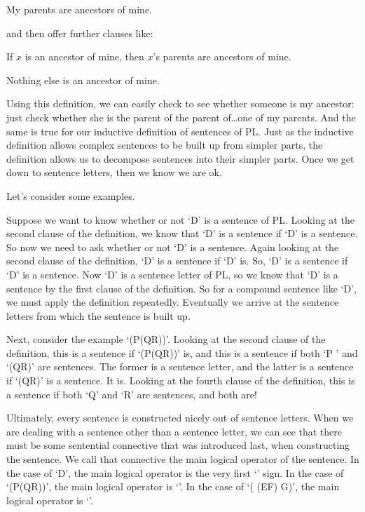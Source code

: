 	\begin{ebullet}
		\item My parents are ancestors of mine.
	\end{ebullet}
and then offer further clauses like:
	\begin{ebullet}
		\item If $x$ is an ancestor of mine, then $x$'s parents are ancestors of mine.
		\item Nothing else is an ancestor of mine.
	\end{ebullet}
Using this definition, we can easily check to see whether someone is my ancestor: just check whether she is the parent of the parent of\ldots one of my parents. And the same is true for our inductive definition of sentences of PL. Just as the inductive definition allows complex sentences to be built up from simpler parts, the definition allows us to decompose sentences into their simpler parts. Once we get down to sentence letters, then we know we are ok.

Let’s consider some examples.

Suppose we want to know whether or not ‘\enot\enot\enot D’ is a sentence of PL. Looking at the second clause of the definition, we know that ‘\enot\enot\enot D’ is a sentence if ‘\enot\enot D’ is a sentence. So now we need to ask whether or not ‘\enot\enot D’ is a sentence. Again looking at the second clause of the definition, ‘\enot\enot D’ is a sentence if ‘\enot D’  is. So, ‘\enot D’ is a sentence if ‘D’ is a sentence. Now ‘D’ is a sentence letter of PL, so we know that ‘D’ is a sentence by the first clause of the definition. So for a compound sentence like ‘\enot\enot\enot D’, we must apply the definition repeatedly. Eventually we arrive at the sentence letters from which the sentence is built up.

Next, consider the example ‘\enot(P\eand \enot(\enot Q\eor  R))’. Looking at the second clause of the definition, this is a sentence if ‘(P\eand \enot(\enot Q\eor R))’ is, and this is a sentence if both ‘P ’ and ‘\enot(\enot Q\eor  R)’ are sentences. The former is a sentence letter, and the latter is a sentence if ‘(\enot Q\eor  R)’ is a sentence. It is. Looking at the fourth clause of the definition, this is a sentence if both ‘\enot Q’ and ‘R’ are sentences, and both are!

Ultimately, every sentence is constructed nicely out of sentence letters. When we are dealing with a sentence other than a sentence letter, we can see that there must be some sentential connective that was introduced last, when constructing the sentence. We call that connective the \gls{main logical operator} of the sentence. In the case of ‘\enot\enot\enot D’, the main logical operator is the very first ‘\enot’ sign. In the case of ‘(P\eand \enot(\enot Q\eor R))’, the main logical operator is ‘\eand’. In the case of ‘( (\enot E\eor  F) \eif  \enot\enot G)’, the main logical operator is ‘\eif ’.

